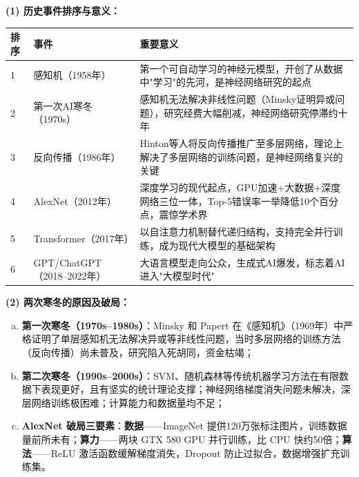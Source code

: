 \documentclass[a4paper,11pt]{ctexart}
\begin{document}
\begin{solutionbox}[参考答案与详细解析]
    \textbf{(1) 历史事件排序与意义：}

    \begin{center}
    \begin{tabular}{p{0.8cm} p{3.5cm} p{6.8cm}}
        \toprule
        排序 & 事件 & 重要意义 \\
        \midrule
        1 & 感知机（1958年） & 第一个可自动学习的神经元模型，开创了从数据中"学习"的先河，是神经网络研究的起点 \\[0.8em]
        2 & 第一次AI寒冬（1970s） & 感知机无法解决非线性问题（Minsky证明异或问题），研究经费大幅削减，神经网络研究停滞约十年 \\[0.8em]
        3 & 反向传播（1986年） & Hinton等人将反向传播推广至多层网络，理论上解决了多层网络的训练问题，是神经网络复兴的关键 \\[0.8em]
        4 & AlexNet（2012年） & 深度学习的现代起点，GPU加速+大数据+深度网络三位一体，Top-5错误率一举降低10个百分点，震惊学术界 \\[0.8em]
        5 & Transformer（2017年） & 以自注意力机制替代递归结构，支持完全并行训练，成为现代大模型的基础架构 \\[0.8em]
        6 & GPT/ChatGPT（2018--2022年） & 大语言模型走向公众，生成式AI爆发，标志着AI进入"大模型时代" \\
        \bottomrule
    \end{tabular}
    \end{center}

    \textbf{(2) 两次寒冬的原因及破局：}

    \begin{enumerate}[a.]
        \item \textbf{第一次寒冬（1970s--1980s）}：Minsky 和 Papert 在《感知机》（1969年）中严格证明了单层感知机无法解决异或等非线性问题，当时多层网络的训练方法（反向传播）尚未普及，研究陷入死胡同，资金枯竭；
        \item \textbf{第二次寒冬（1990s--2000s）}：SVM、随机森林等传统机器学习方法在有限数据下表现更好，且有坚实的统计理论支撑；神经网络梯度消失问题未解决，深层网络训练极困难；计算能力和数据量均不足；
        \item \textbf{AlexNet 破局三要素}：\textbf{数据}——ImageNet 提供120万张标注图片，训练数据量前所未有；\textbf{算力}——两块 GTX 580 GPU 并行训练，比 CPU 快约50倍；\textbf{算法}——ReLU 激活函数缓解梯度消失，Dropout 防止过拟合，数据增强扩充训练集。
    \end{enumerate}


\end{solutionbox}
\end{document}
